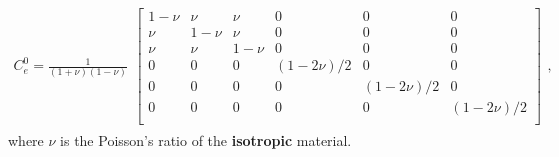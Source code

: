 \begin{align}
C_e^0 = \frac{1}{(1+\nu)(1-\nu)}
\begin{split}
\begin{bmatrix}
1-\nu & \nu & \nu & 0 & 0 & 0 \\ 
\nu & 1-\nu & \nu & 0 & 0 & 0 \\ 
\nu & \nu & 1-\nu & 0 & 0 & 0 \\ 
0 & 0 & 0 & (1-2\nu)/2 & 0 & 0 \\ 
0 & 0 & 0 & 0 & (1-2\nu)/2 & 0 \\ 
0 & 0 & 0 & 0 & 0 & (1-2\nu)/2\\
\end{bmatrix} 
\end{split},
\label{equ_constit}
\end{align}
where \textbf{$\nu$} is the Poisson's ratio of the \textbf{isotropic} material.\\

